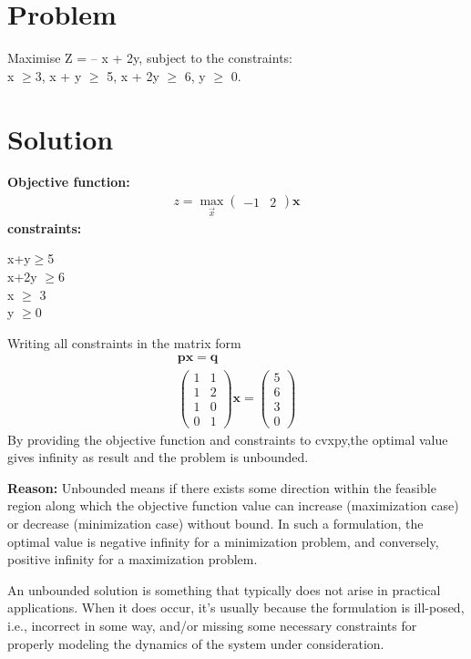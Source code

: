\documentclass[10pt, a4paper]{article}
\title{\mytitle}
\author{\myauthor\hspace{1em}\\\contact\\FWC22011\hspace{6.5em}IITH\hspace{0.5em}\mymodule\hspace{6em}Optimization:Basic}
\date{}
\newcommand{\myvec}[1]{\ensuremath{\begin{pmatrix}#1\end{pmatrix}}}
\let\vec\mathbf
\begin{document}
	\maketitle
	\tableofcontents
   \section{Problem}
Maximise Z = – x + 2y, subject to the constraints:\\
x $\geq$3, x + y $\geq$ 5, x + 2y $\geq$ 6, y $\geq$ 0.
\section{Solution}

\textbf{Objective function:}
\begin{align}
z = \max_\Vec{x}\myvec{-1 &2}\vec{x}
\end{align}
\textbf{constraints:}
\begin{center}
    x+y$ \geq$5\\
    x+2y $\geq$6 \\
    x $\geq$ 3\\
    y $\geq$0
\end{center}

Writing all constraints in the matrix form
\begin{align}
    \vec{p}\vec{x}=\vec{q}\\
    \myvec{1&1\\1&2\\1&0\\0&1}\vec{x}=\myvec{5\\6\\3\\0}
\end{align}
By providing the objective function and constraints to cvxpy,the optimal value gives infinity as result and the problem is unbounded.

\textbf{Reason:}
Unbounded means  if there exists some direction within the feasible region along which the objective function value can increase (maximization case) or decrease (minimization case) without bound. In such a formulation, the optimal value is negative infinity for a minimization problem, and conversely, positive infinity for a maximization problem.

An unbounded solution is something that typically does not arise in practical applications. When it does occur, it’s usually because the formulation is ill-posed, i.e., incorrect in some way, and/or missing some necessary constraints for properly modeling the dynamics of the system under consideration.
\end{document}
